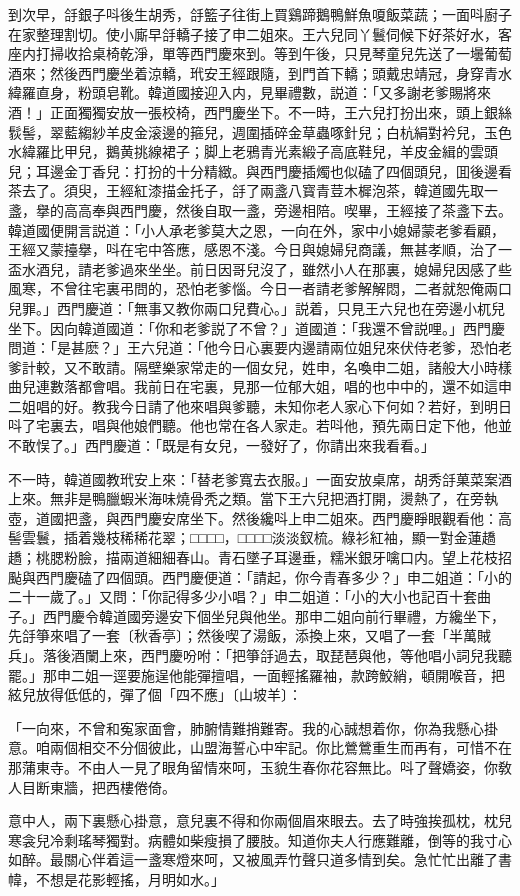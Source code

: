 到次早，㧱銀子呌後生胡秀，㧱籃子往街上買鷄蹄鵝鴨鮮魚嗄飯菜蔬；一面呌廚子在家整理割切。使小廝早㧱轎子接了申二姐來。王六兒同丫鬟伺候下好茶好水，客座内打掃收拾桌椅乾淨，單等西門慶來到。等到午後，只見琴童兒先送了一壜葡萄酒來；然後西門慶坐着涼轎，玳安王經跟隨，到門首下轎；頭戴忠靖冠，身穿青水緯羅直身，粉頭皂靴。韓道國接迎入内，見畢禮數，説道：「又多謝老爹賜將來酒！」正面獨獨安放一張校椅，西門慶坐下。不一時，王六兒打扮出來，頭上銀絲䯼髻，翠藍縐紗羊皮金滚邊的箍兒，週圍插碎金草蟲啄針兒；白杭絹對衿兒，玉色水緯羅比甲兒，鵝黄挑線裙子；脚上老鴉青光素緞子高底鞋兒，羊皮金緝的雲頭兒；耳邊金丁香兒：打扮的十分精緻。與西門慶插燭也似磕了四個頭兒，囬後邊看茶去了。須臾，王經紅漆描金托子，㧱了兩盞八寳青荳木樨泡茶，韓道國先取一盞，擧的高高奉與西門慶，然後自取一盞，旁邊相陪。喫畢，王經接了茶盞下去。韓道國便開言説道：「小人承老爹莫大之恩，一向在外，家中小媳婦蒙老爹看顧，王經又蒙擡擧，呌在宅中答應，感恩不淺。今日與媳婦兒商議，無甚孝順，治了一盃水酒兒，請老爹過來坐坐。前日因哥兒沒了，雖然小人在那裏，媳婦兒因感了些風寒，不曾往宅裏弔問的，恐怕老爹惱。今日一者請老爹解解悶，二者就恕俺兩口兒罪。」西門慶道：「無事又教你兩口兒費心。」説着，只見王六兒也在旁邊小杌兒坐下。因向韓道國道：「你和老爹説了不曾？」道國道：「我還不曾説哩。」西門慶問道：「是甚麽？」王六兒道：「他今日心裏要内邊請兩位姐兒來伏侍老爹，恐怕老爹計較，又不敢請。隔壁樂家常走的一個女兒，姓申，名喚申二姐，諸般大小時樣曲兒連數落都會唱。我前日在宅裏，見那一位郁大姐，唱的也中中的，還不如這申二姐唱的好。教我今日請了他來唱與爹聽，未知你老人家心下何如？若好，到明日呌了宅裏去，唱與他娘們聽。他也常在各人家走。若呌他，預先兩日定下他，他並不敢悮了。」西門慶道：「既是有女兒，一發好了，你請出來我看看。」

不一時，韓道國教玳安上來：「替老爹寬去衣服。」一面安放桌席，胡秀㧱菓菜案酒上來。無非是鴨臘蝦米海味燒骨秃之類。當下王六兒把酒打開，燙熱了，在旁執壺，道國把盞，與西門慶安席坐下。然後纔呌上申二姐來。西門慶睜眼觀看他：高髻雲鬟，插着幾枝稀稀花翠；□□□□，□□□□淡淡釵梳。綠衫紅袖，顯一對金蓮趫趫；桃腮粉臉，描兩道細細春山。青石墜子耳邊垂，糯米銀牙噙口内。望上花枝招颭與西門慶磕了四個頭。西門慶便道：「請起，你今青春多少？」申二姐道：「小的二十一歲了。」又問：「你記得多少小唱？」申二姐道：「小的大小也記百十套曲子。」西門慶令韓道國旁邊安下個坐兒與他坐。那申二姐向前行畢禮，方纔坐下，先㧱箏來唱了一套〔秋香亭〕；然後喫了湯飯，添換上來，又唱了一套「半萬賊兵」。落後酒闌上來，西門慶吩咐：「把箏㧱過去，取琵琶與他，等他唱小詞兒我聽罷。」那申二姐一逕要施逞他能彈擅唱，一面輕搖羅袖，款跨鮫綃，頓開喉音，把絃兒放得低低的，彈了個「四不應」〔山坡羊〕：

\begin{myquote}
「一向來，不曾和寃家面會，肺腑情難捎難寄。我的心誠想着你，你為我懸心掛意。咱兩個相交不分個彼此，山盟海誓心中牢記。你比鶯鶯重生而再有，可惜不在那蒲東寺。不由人一見了眼角留情來呵，玉貌生春你花容無比。呌了聲嬌姿，你敎人目断東牆，把西樓倦倚。

意中人，兩下裏懸心掛意，意兒裏不得和你兩個眉來眼去。去了時強挨孤枕，枕兒寒衾兒冷剩瑤琴獨對。病體如柴瘦損了腰肢。知道你夫人行應難離，倒等的我寸心如醉。最關心伴着這一盞寒燈來呵，又被風弄竹聲只道多情到矣。急忙忙出離了書幃，不想是花影輕搖，月明如水。」
\end{myquote}

